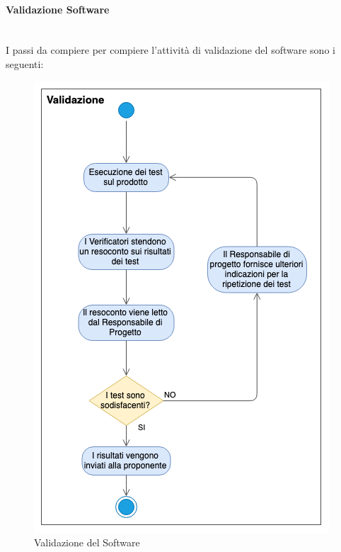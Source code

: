 \paragraph{Validazione Software} \-\\
I passi da compiere per compiere l'attività di validazione del software sono i seguenti:
\begin{figure}[H]
	\begin{center}
		\includegraphics[scale=0.7]{./images/Validazione.png}
	\end{center}
	\caption{Validazione del Software}
\end{figure}
